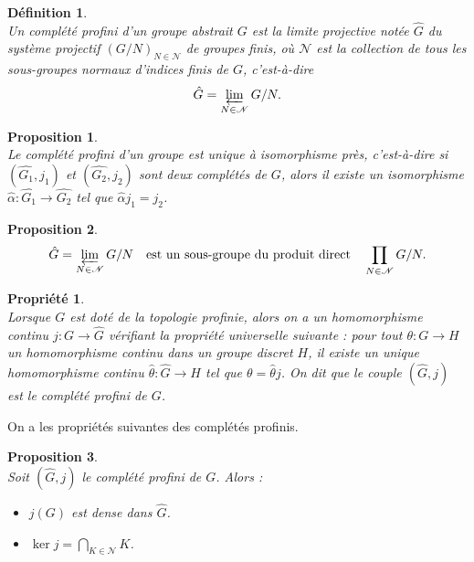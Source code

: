 \documentclass[a4paper, 14pt]{report}
\newtheorem{definition}{Définition}[section]
\newtheorem{proposition}{Proposition}[section]
\newtheorem{propriety}{Propriété}[section]
\begin{document}
\begin{onehalfspace}
{			\begin{definition} \cite{herfort2012profinite}\\
				Un complété profini d’un groupe abstrait \( G \) est la limite projective notée $\widehat{G}$ du système projectif \( (G/N)_{N \in \mathscr{N}} \) de groupes finis, où \( \mathscr{N} \) est la collection de tous les sous-groupes normaux d’indices finis de \( G \), c’est-à-dire
				\[
				\hat{G} = \varprojlim_{N \in \mathscr{N}} G/N.
				\]
			\end{definition}
			
			\begin{proposition} \cite{herfort2012profinite}\\
				Le complété profini d’un groupe est unique à isomorphisme près, c’est-à-dire si $(\widehat{G_1}, j_1)$ et $(\widehat{G_2}, j_2)$ sont deux complétés de $G$, alors il existe un isomorphisme $\widehat{\alpha} : \widehat{G_1} \to \widehat{G_2}$ tel que $\widehat{\alpha} j_1 = j_2$.
			\end{proposition}
			
			\begin{proposition} \cite{herfort2012profinite}\\
				\[
				\hat{G} = \varprojlim_{N \in \mathscr{N}} G/N \quad \text{est un sous-groupe du produit direct} \quad \prod_{N \in \mathscr{N}} G/N.
				\]
			\end{proposition}
			
			
			\begin{propriety}  \cite{herfort2012profinite}\\
				Lorsque $G$ est doté de la topologie profinie, alors on a un homomorphisme continu $j : G \to \widehat{G}$ vérifiant la propriété universelle suivante : pour tout $\theta : G \to H$ un homomorphisme continu dans un groupe discret $H$, il existe un unique homomorphisme continu $\widehat{\theta} : \widehat{G} \to H$ tel que $\theta = \widehat{\theta} j$. On dit que le couple $(\widehat{G}, j)$ est le complété profini de $G$.
			\end{propriety}
			On a les propriétés suivantes des complétés profinis.
			
			\begin{proposition} \cite{ribes-zalesskii}\\
				Soit $(\widehat{G}, j)$ le complété profini de $G$. Alors :
				\begin{itemize}
					\item[(a)] $j(G)$ est dense dans $\widehat{G}$.
					\item[(b)] $\ker j = \bigcap_{K \in \mathcal{N}} K$.
				\end{itemize}	
			\end{proposition}
			
}
\end{onehalfspace}
\end{document}
